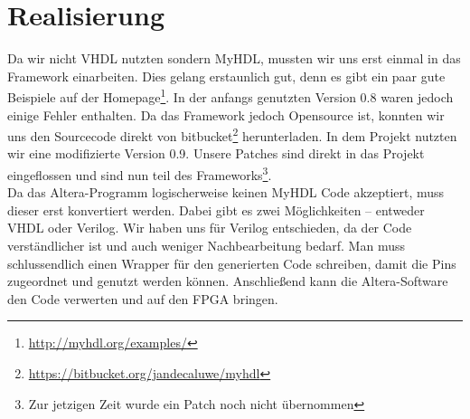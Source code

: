 \section{Realisierung}
Da wir nicht VHDL nutzten sondern MyHDL, mussten wir uns erst einmal in das Framework einarbeiten. Dies gelang erstaunlich gut, denn es gibt ein paar gute Beispiele auf der Homepage\footnote{\url{http://myhdl.org/examples/}}. In der anfangs genutzten Version 0.8 waren jedoch einige Fehler enthalten. Da das Framework jedoch Opensource ist, konnten wir uns den Sourcecode direkt von bitbucket\footnote{\url{https://bitbucket.org/jandecaluwe/myhdl}} herunterladen. In dem Projekt nutzten wir eine modifizierte Version 0.9. Unsere Patches sind direkt in das Projekt eingeflossen und sind nun teil des Frameworks\footnote{Zur jetzigen Zeit wurde ein Patch noch nicht übernommen}.\\
Da das Altera-Programm logischerweise keinen MyHDL Code akzeptiert, muss dieser erst konvertiert werden. Dabei gibt es zwei Möglichkeiten -- entweder VHDL oder Verilog. Wir haben uns für Verilog entschieden, da der Code verständlicher ist und auch weniger Nachbearbeitung bedarf. Man muss schlussendlich einen Wrapper für den generierten Code schreiben, damit die Pins zugeordnet und genutzt werden können. Anschließend kann die Altera-Software den Code verwerten und auf den FPGA bringen.
